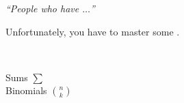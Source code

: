 
\begin{frame}{}

  \begin{center}
  \end{center}
\end{frame}

\begin{frame}{}
  \begin{center}
      {\it \large ``People who  have  $\ldots$''}
  \end{center}


  \begin{center}
  \end{center}
\end{frame}

\begin{frame}{}

  \begin{center}
    {\large Unfortunately, you have to master some .}
  \end{center}
\end{frame}

\begin{frame}{}

  \begin{center}
     \\[15pt]  \pause

    \textcolor{blue!50}{Sums \qquad $\sum$} \\[8pt]  \pause
    \textcolor{blue!50}{Binomials \qquad $\binom{n}{k}$}
  \end{center}
\end{frame}

